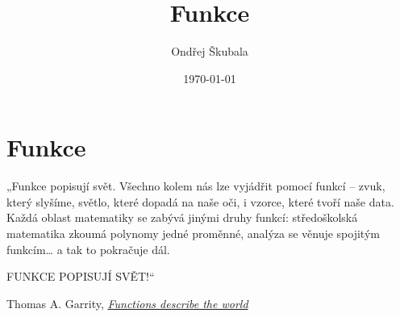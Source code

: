 \documentclass[12pt,a4paper]{article}
\title{Funkce}
\author{Ondřej Škubala}
\date{\today}
\begin{document}
\maketitle
\newpage


\section{Funkce}


\begin{quotebox}
{„Funkce popisují svět. Všechno kolem nás lze vyjádřit pomocí funkcí – zvuk, který slyšíme, světlo, které dopadá na naše oči, i vzorce, které tvoří naše data.  
Každá oblast matematiky se zabývá jinými druhy funkcí: středoškolská matematika zkoumá polynomy jedné proměnné, analýza se věnuje spojitým funkcím… a tak to pokračuje dál.  

FUNKCE POPISUJÍ SVĚT!“}
{Thomas A. Garrity, \textit{\href{https://www.youtube.com/watch?v=BWZTlfrneD8}{Functions describe the world}}}
\end{quotebox}
\end{document}

